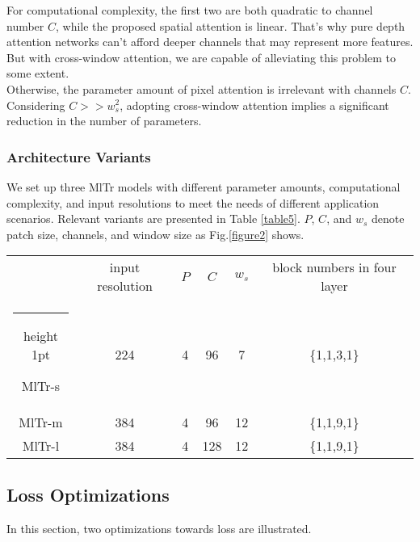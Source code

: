 \documentclass{article} \usepackage[numbers,sort&compress]{natbib}
\makeatletter
\newcommand{\thickhline}{\noalign {\ifnum 0=`}\fi \hrule height 1pt
    \futurelet \reserved@a \@xhline
}
\makeatother
\begin{document}
For computational complexity, the first two are both quadratic to channel number $C$, while the proposed spatial attention is linear. That's why pure depth attention networks can't afford deeper channels that may represent more features. But with cross-window attention, we are capable of alleviating this problem to some extent.\\
Otherwise, the parameter amount of pixel attention is irrelevant with channels $C$. Considering $C>>w_s^2$, adopting cross-window attention implies a significant reduction in the number of parameters.


\subsubsection{Architecture Variants}

We set up three MlTr models with different parameter amounts, computational complexity, and input resolutions to meet the needs of different application scenarios. Relevant variants are presented in Table \textcolor{red}{\ref{table5}}. $P$, $C$, and $w_s$ denote patch size, channels, and window size as Fig.\textcolor{red}{\ref{figure2}} shows. 

\begin{table*}[h]
\centering
\caption{Architecture Variants of MlTr.}
\label{table5}
\begin{tabular}{|c|c|c|c|c|c|}
\hline
\  & input resolution & $P$ & $C$ & $w_s$ &block numbers in four layer \\
\thickhline
MlTr-s &224 &4 &96 &7 &\{1,1,3,1\}  \\
\hline
MlTr-m &384 &4 &96  &12  &\{1,1,9,1\}  \\
\hline
MlTr-l &384 &4 &128  &12  &\{1,1,9,1\}  \\
\hline
\end{tabular}
\end{table*}

\subsection{Loss Optimizations}
\label{loss}
In this section, two optimizations towards loss are illustrated. 
\end{document}
